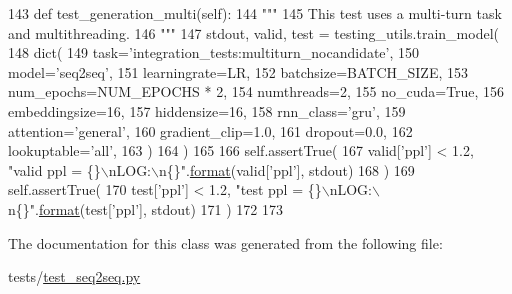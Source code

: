 \begin{DoxyCode}
143     \textcolor{keyword}{def }test\_generation\_multi(self):
144         \textcolor{stringliteral}{"""}
145 \textcolor{stringliteral}{        This test uses a multi-turn task and multithreading.}
146 \textcolor{stringliteral}{        """}
147         stdout, valid, test = testing\_utils.train\_model(
148             dict(
149                 task=\textcolor{stringliteral}{'integration\_tests:multiturn\_nocandidate'},
150                 model=\textcolor{stringliteral}{'seq2seq'},
151                 learningrate=LR,
152                 batchsize=BATCH\_SIZE,
153                 num\_epochs=NUM\_EPOCHS * 2,
154                 numthreads=2,
155                 no\_cuda=\textcolor{keyword}{True},
156                 embeddingsize=16,
157                 hiddensize=16,
158                 rnn\_class=\textcolor{stringliteral}{'gru'},
159                 attention=\textcolor{stringliteral}{'general'},
160                 gradient\_clip=1.0,
161                 dropout=0.0,
162                 lookuptable=\textcolor{stringliteral}{'all'},
163             )
164         )
165 
166         self.assertTrue(
167             valid[\textcolor{stringliteral}{'ppl'}] < 1.2, \textcolor{stringliteral}{"valid ppl = \{\}\(\backslash\)nLOG:\(\backslash\)n\{\}"}.\hyperlink{namespaceparlai_1_1chat__service_1_1services_1_1messenger_1_1shared__utils_a32e2e2022b824fbaf80c747160b52a76}{format}(valid[\textcolor{stringliteral}{'ppl'}], stdout)
168         )
169         self.assertTrue(
170             test[\textcolor{stringliteral}{'ppl'}] < 1.2, \textcolor{stringliteral}{"test ppl = \{\}\(\backslash\)nLOG:\(\backslash\)n\{\}"}.\hyperlink{namespaceparlai_1_1chat__service_1_1services_1_1messenger_1_1shared__utils_a32e2e2022b824fbaf80c747160b52a76}{format}(test[\textcolor{stringliteral}{'ppl'}], stdout)
171         )
172 
173 
\end{DoxyCode}


The documentation for this class was generated from the following file\+:\begin{DoxyCompactItemize}
\item 
tests/\hyperlink{test__seq2seq_8py}{test\+\_\+seq2seq.\+py}\end{DoxyCompactItemize}
